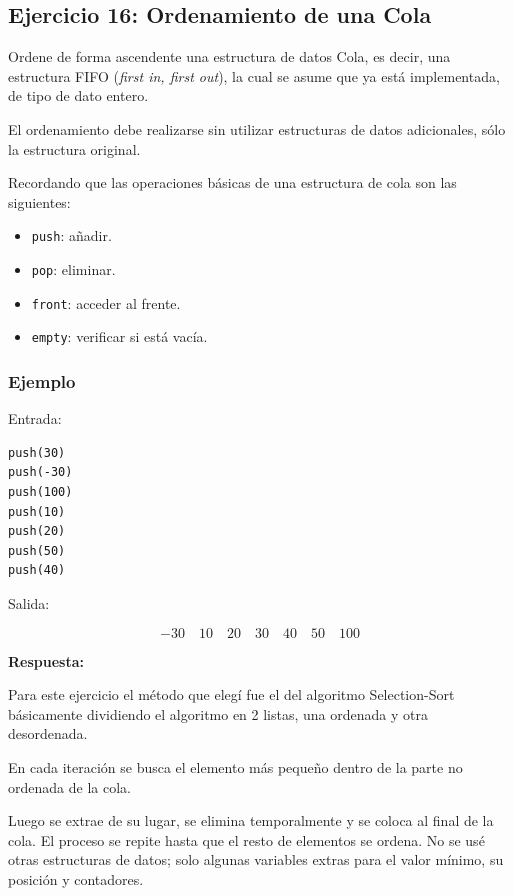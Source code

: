 \documentclass[12pt]{article}
\newcommand{\respuesta}{
    \vspace{0.3cm}
    \noindent\textbf{Respuesta:}
    \vspace{0.2cm}
}
\begin{document}
\subsection*{Ejercicio 16: Ordenamiento de una Cola}

Ordene de forma ascendente una estructura de datos Cola, es decir, una estructura FIFO 
(\textit{first in, first out}), la cual se asume que ya está implementada, de tipo de dato entero.

El ordenamiento debe realizarse sin utilizar estructuras de datos adicionales, sólo la estructura original.

Recordando que las operaciones básicas de una estructura de cola son las siguientes:

\begin{itemize}
    \item \texttt{push}: añadir.
    \item \texttt{pop}: eliminar.
    \item \texttt{front}: acceder al frente.
    \item \texttt{empty}: verificar si está vacía.
\end{itemize}

\subsubsection*{Ejemplo}

Entrada:

\begin{lstlisting}
push(30)
push(-30)
push(100)
push(10)
push(20)
push(50)
push(40)
\end{lstlisting}

Salida:

\[
-30\quad 10\quad 20\quad 30\quad 40\quad 50\quad 100
\]

\respuesta

Para este ejercicio el método que elegí fue el del algoritmo Selection-Sort básicamente dividiendo el algoritmo en 2 listas, una ordenada y otra desordenada.

En cada iteración se busca el elemento más pequeño dentro de la parte no ordenada de la cola.

Luego se extrae de su lugar, se elimina temporalmente y se coloca al final de la cola. El proceso se repite hasta que el resto de elementos se ordena. No se usé otras estructuras de datos; solo algunas variables extras para el valor mínimo, su posición y contadores.
\end{document}
